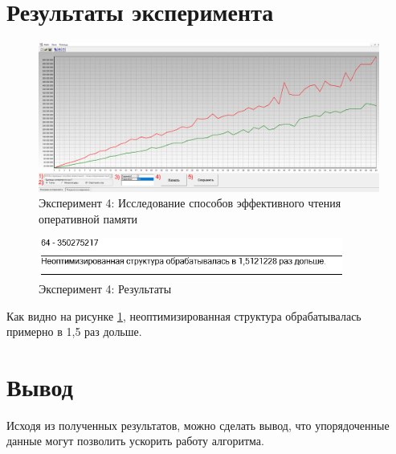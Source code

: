 \section{Результаты эксперимента}
\begin{figure}[ht!]
    \centering
    \includegraphics[width=170mm]{./img/4.png}
    \caption{Эксперимент 4: Исследование способов эффективного чтения оперативной памяти}
\end{figure}

\begin{figure}[ht!]
    \centering
    \includegraphics[width=100mm]{./img/04.png}
    \caption{Эксперимент 4: Результаты\label{res_04}}
\end{figure}

Как видно на рисунке \ref{res_04}, неоптимизированная структура обрабатывалась примерно в 1,5 раз дольше.

\section{Вывод}
Исходя из полученных результатов, можно сделать вывод, что упорядоченные данные могут позволить ускорить работу алгоритма.